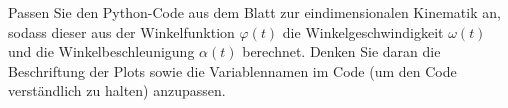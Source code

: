 \begin{ExerciseBlock}
Passen Sie den Python-Code aus dem Blatt zur eindimensionalen Kinematik an, sodass dieser aus der Winkelfunktion $\varphi(t)$ die Winkelgeschwindigkeit $\omega(t)$ und die Winkelbeschleunigung $\alpha(t)$ berechnet. Denken Sie daran die Beschriftung der Plots sowie die Variablennamen im Code (um den Code verständlich zu halten) anzupassen.
\end{ExerciseBlock}
